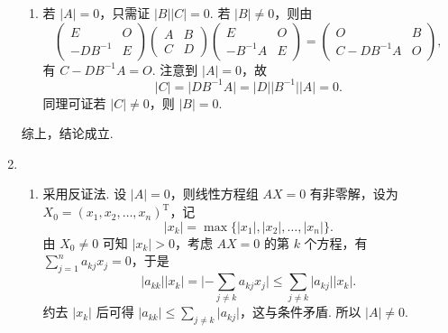 \begin{enumerate}
\begin{enumerate}
              \item 若 $\lvert A \rvert = 0$，只需证 $\lvert B \rvert \lvert C \rvert = 0$. 若 $\lvert B \rvert \neq 0$，则由
                    \[\begin{pmatrix}
                            E        & O \\
                            -DB^{-1} & E
                        \end{pmatrix} \begin{pmatrix}
                            A & B \\
                            C & D
                        \end{pmatrix} \begin{pmatrix}
                            E        & O \\
                            -B^{-1}A & E
                        \end{pmatrix} = \begin{pmatrix}
                            O          & B \\
                            C-DB^{-1}A & O
                        \end{pmatrix},\]
                    有 $C-DB^{-1}A = O$. 注意到 $\lvert A \rvert = 0$，故 \[\lvert C \rvert = \lvert DB^{-1}A \rvert = \lvert D \rvert \lvert B^{-1} \rvert \lvert A \rvert = 0.\] 同理可证若 $\lvert C \rvert \neq 0$，则 $\lvert B \rvert = 0$.
          \end{enumerate}
          综上，结论成立.

    \item \begin{enumerate}
              \item \label{item:13:B:5:1}
                    采用反证法. 设 $\lvert A \rvert = 0$，则线性方程组 $AX = 0$ 有非零解，设为 $X_0 = (x_1, x_2, \ldots, x_n)^{\mathrm{T}}$，记
                    \[\lvert x_k \rvert = \max \{\lvert x_1 \rvert, \lvert x_2 \rvert, \ldots, \lvert x_n \rvert\}.\]
                    由 $X_0 \neq 0$ 可知 $\lvert x_k \rvert > 0$，考虑 $AX = 0$ 的第 $k$ 个方程，有 $\displaystyle\sum_{j=1}^n a_{kj}x_j = 0$，于是
                    \[\lvert a_{kk} \rvert \lvert x_k \rvert = \lvert -\displaystyle\sum_{j \neq k}a_{kj}x_j \rvert \leqslant \displaystyle\sum_{j \neq k}\lvert a_{kj} \rvert \lvert x_k \rvert.\]
                    约去 $\lvert x_k \rvert$ 后可得 $\lvert a_{kk} \rvert \leqslant \displaystyle\sum_{j \neq k} \lvert a_{kj} \rvert$，这与条件矛盾. 所以 $\lvert A \rvert \neq 0$.


\end{enumerate}
\end{enumerate}
